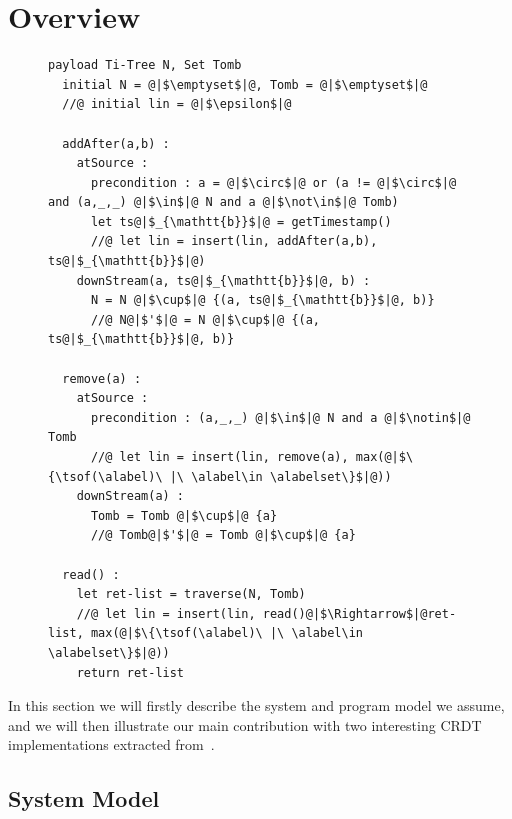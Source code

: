 \section{Overview}
\label{sec:overview}


\begin{figure}[t]
\begin{lstlisting}[basicstyle=\ttfamily\footnotesize,caption={Replicated Growing Array (RGA) CRDT pseudo-code (adapted from~\cite{ShapiroPBZ11})},captionpos=b,label={lst:rga}]
  payload Ti-Tree N, Set Tomb
  initial N = @|$\emptyset$|@, Tomb = @|$\emptyset$|@
  //@ initial lin = @|$\epsilon$|@

  addAfter(a,b) :
    atSource :
      precondition : a = @|$\circ$|@ or (a != @|$\circ$|@ and (a,_,_) @|$\in$|@ N and a @|$\not\in$|@ Tomb)
      let ts@|$_{\mathtt{b}}$|@ = getTimestamp()
      //@ let lin = insert(lin, addAfter(a,b), ts@|$_{\mathtt{b}}$|@)
    downStream(a, ts@|$_{\mathtt{b}}$|@, b) :
      N = N @|$\cup$|@ {(a, ts@|$_{\mathtt{b}}$|@, b)}
      //@ N@|$'$|@ = N @|$\cup$|@ {(a, ts@|$_{\mathtt{b}}$|@, b)}

  remove(a) :
    atSource :
      precondition : (a,_,_) @|$\in$|@ N and a @|$\notin$|@ Tomb
      //@ let lin = insert(lin, remove(a), max(@|$\{\tsof(\alabel)\ |\ \alabel\in \alabelset\}$|@))
    downStream(a) :
      Tomb = Tomb @|$\cup$|@ {a}
      //@ Tomb@|$'$|@ = Tomb @|$\cup$|@ {a}

  read() :
    let ret-list = traverse(N, Tomb)
    //@ let lin = insert(lin, read()@|$\Rightarrow$|@ret-list, max(@|$\{\tsof(\alabel)\ |\ \alabel\in \alabelset\}$|@))
    return ret-list
\end{lstlisting}
\end{figure}

In this section we will firstly describe the system and program model
we assume, and we will then illustrate our main contribution with two
interesting CRDT implementations extracted from~\cite{ShapiroPBZ11}.

\subsection{System Model}
\label{sec:sys-model}

